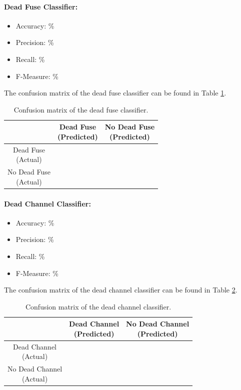 \paragraph{Dead Fuse Classifier:}
\begin{itemize}
  \item Accuracy: \%
  \item Precision: \%
  \item Recall: \%
  \item F-Measure: \%
\end{itemize}
The confusion matrix of the dead fuse classifier can be found in Table
\ref{tbl:confusion-fuse}.
\begin{table}[h]
  \centering
  \renewcommand\theadfont{\bfseries}
  \begin{tabular}{|c|c|c|}
    \hline
    & \thead{Dead Fuse\\(Predicted)} & \thead{No Dead Fuse\\(Predicted)} \\
    \hline
    \thead{Dead Fuse\\(Actual)} & & \\
    \hline
    \thead{No Dead Fuse\\(Actual)} & & \\
    \hline
  \end{tabular}
  \caption{Confusion matrix of the dead fuse classifier.}
  \label{tbl:confusion-fuse}
\end{table}

\paragraph{Dead Channel Classifier:}
\begin{itemize}
  \item Accuracy: \%
  \item Precision: \%
  \item Recall: \%
  \item F-Measure: \%
\end{itemize}
The confusion matrix of the dead channel classifier can be found in Table
\ref{tbl:confusion-channel}.
\begin{table}[h]
  \centering
  \renewcommand\theadfont{\bfseries}
  \begin{tabular}{|c|c|c|}
    \hline
    & \thead{Dead Channel\\(Predicted)} & \thead{No Dead Channel\\(Predicted)} \\
    \hline
    \thead{Dead Channel\\(Actual)} & & \\
    \hline
    \thead{No Dead Channel\\(Actual)} & & \\
    \hline
  \end{tabular}
  \caption{Confusion matrix of the dead channel classifier.}
  \label{tbl:confusion-channel}
\end{table}

